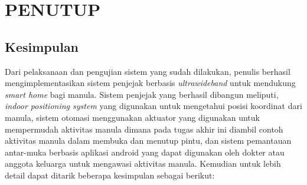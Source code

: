 \chapter{PENUTUP}
\vspace{1ex}

\section{Kesimpulan}
Dari pelaksanaan dan pengujian sistem yang sudah dilakukan, penulis berhasil mengimplementasikan sistem penjejak berbasis \textit{ultrawideband} untuk mendukung \textit{smart home} bagi manula. Sistem penjejak yang berhasil dibangun meliputi, \textit{indoor positioning system} yang digunakan untuk mengetahui posisi koordinat dari manula, sistem otomasi menggunakan aktuator yang digunakan untuk mempermudah aktivitas manula dimana pada tugas akhir ini diambil contoh aktivitas manula dalam membuka dan menutup pintu, dan sistem pemantauan antar-muka berbasis aplikasi android yang dapat digunakan oleh dokter atau anggota keluarga untuk mengawasi aktivitas manula. Kemudian untuk lebih detail dapat ditarik beberapa kesimpulan sebagai berikut:
